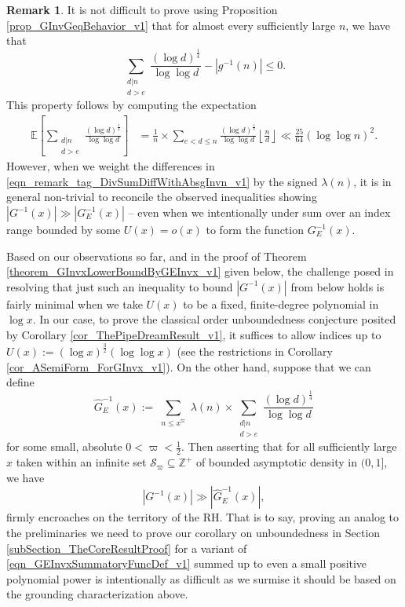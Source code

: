 \documentclass[11pt,reqno,a4letter]{article}
\numberwithin{figure}{section}
\numberwithin{table}{section}
\newcommand{\Floor}[2]{\ensuremath{\left\lfloor \frac{#1}{#2} \right\rfloor}}
\theoremstyle{plain}
\numberwithin{theorem}{section}
\theoremstyle{definition}
\newtheorem{remark}[theorem]{Remark}
\begin{document}
\begin{remark} 
It is not difficult to prove using 
Proposition \ref{prop_GInvGeqBehavior_v1} that for almost every sufficiently large $n$, 
we have that 
\begin{equation} 
\label{eqn_remark_tag_DivSumDiffWithAbsgInvn_v1} 
\sum_{\substack{d|n \\ d>e}} \frac{(\log d)^{\frac{1}{4}}}{\log\log d} - |g^{-1}(n)| \leq 0. 
\end{equation} 
This property follows by computing the expectation 
\begin{align*} 
\mathbb{E}\left[\sum_{\substack{d|n \\ d>e}} \frac{(\log d)^{\frac{1}{4}}}{\log\log d}\right] & = 
     \frac{1}{n} \times \sum_{e < d \leq n} \frac{(\log d)^{\frac{1}{4}}}{\log\log d} 
     \Floor{n}{d} 
     \ll \frac{25}{64} (\log\log n)^2. 
\end{align*} 
However, when we weight the differences in \eqref{eqn_remark_tag_DivSumDiffWithAbsgInvn_v1} by the 
signed $\lambda(n)$, it is in general non-trivial to reconcile the observed inequalities 
showing $|G^{-1}(x)| \gg |G_E^{-1}(x)|$ -- even when we intentionally under sum over an 
index range bounded by some $U(x) = o(x)$ to form the function $G_E^{-1}(x)$.  

Based on our observations so far, and in the proof of 
Theorem \ref{theorem_GInvxLowerBoundByGEInvx_v1} given below, 
the challenge posed in resolving that just such an inequality to bound $|G^{-1}(x)|$ from 
below holds is fairly minimal when we take 
$U(x)$ to be a fixed, finite-degree polynomial in $\log x$. 
In our case, to prove the classical order unboundedness conjecture posited by 
Corollary \ref{cor_ThePipeDreamResult_v1}, it suffices to allow indices up to 
$U(x) := (\log x)^{\frac{3}{2}} (\log\log x)$ 
(see the restrictions in Corollary \ref{cor_ASemiForm_ForGInvx_v1}). 
On the other hand, suppose that we can define 
\[
\widehat{G}_E^{-1}(x) := \sum_{\substack{n \leq x^{\varpi}}} \lambda(n) \times 
     \sum_{\substack{d|n \\ d > e}} \frac{(\log d)^{\frac{1}{4}}}{\log\log d}
\]
for some small, absolute $0 < \varpi < \frac{1}{2}$. Then asserting that for all 
sufficiently large $x$ taken within an 
infinite set $\mathcal{S}_{\varpi} \subseteq \mathbb{Z}^{+}$ of bounded asymptotic 
density in $(0, 1]$, we have 
\[
|G^{-1}(x)| \gg |\widehat{G}_E^{-1}(x)|, 
\]
firmly encroaches on the territory of the RH. That is to say, proving an analog to the 
preliminaries we need to prove our corollary on unboundedness in 
Section \ref{subSection_TheCoreResultProof} for a variant of 
\eqref{eqn_GEInvxSummatoryFuncDef_v1} 
summed up to even a small positive polynomial power is intentionally 
as difficult as we surmise it should be based on the grounding characterization above. 
\end{remark} 
\end{document}

